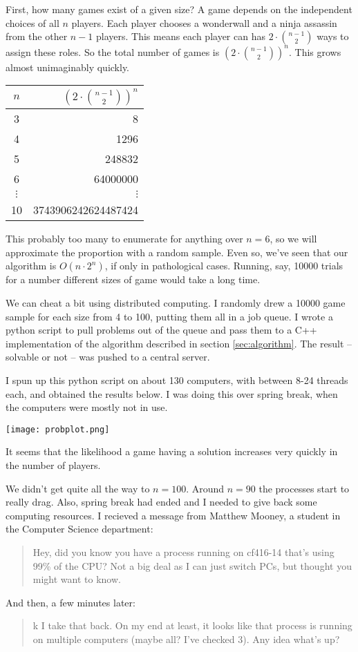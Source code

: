 \documentclass[12pt]{article}
\begin{document}
    First, how many games exist of a given size? A game depends on the independent choices of all $n$ players. Each player chooses a wonderwall and a ninja assassin from the other $n-1$ players. This means each player can has $2\cdot \binom{n-1}{2}$ ways to assign these roles. So the total number of games is $\displaystyle \left(2 \cdot \binom{n-1}{2}\right)^n$. This grows almost unimaginably quickly. 
    \begin{center}
        \begin{tabular}{c | r}
        $n$ & $\displaystyle \left(2 \cdot \binom{n-1}{2}\right)^n$\\
        \hline
        3 & 8\\
        4 & 1296 \\
        5 & 248832 \\
        6 & 64000000\\
        $\vdots$ & $\vdots$ \\
        10 & 3743906242624487424
        \end{tabular}
    \end{center}
    This probably too many to enumerate for anything over $n=6$, so we will approximate the proportion with a random sample. Even so, we've seen that our algorithm is $O(n\cdot 2^n)$, if only in pathological cases. Running, say, 10000 trials for a number different sizes of game would take a long time.

    We can cheat a bit using distributed computing. I randomly drew a 10000 game sample for each size from 4 to 100, putting them all in a job queue. I wrote a python script to pull problems out of the queue and pass them to a C++ implementation of the algorithm described in section \ref{sec:algorithm}. The result -- solvable or not -- was pushed to a central server. 

    I spun up this python script on about 130 computers, with between 8-24 threads each, and obtained the results below. I was doing this over spring break, when the computers were mostly not in use.

    \begin{center}
    \texttt{[image: probplot.png]}
    \end{center}

    It seems that the likelihood a game having a solution increases very quickly in the number of players.

    We didn't get quite all the way to $n=100$. Around $n=90$ the processes start to really drag. Also, spring break had ended and I needed to give back some computing resources. I recieved a message from Matthew Mooney, a student in the Computer Science department:
    \begin{quote}
    Hey, did you know you have a process running on cf416-14 that's using 99\% of the CPU? Not a big deal as I can just switch PCs, but thought you might want to know.
    \end{quote}
    And then, a few minutes later:
    \begin{quote}
    k I take that back. On my end at least, it looks like that process is running on multiple computers (maybe all? I've checked 3). Any idea what's up?
    \end{quote}
\end{document}
